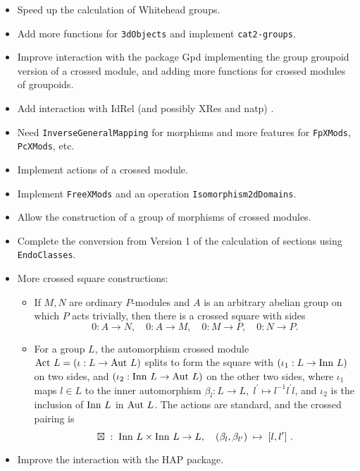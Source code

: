 \documentclass[a4paper,11pt]{report}
\begin{document}
{{\begin{itemize}
\item  Speed up the calculation of Whitehead groups. 
\item  Add more functions for \texttt{3dObjects} and implement \texttt{cat2-groups}. 
\item  Improve interaction with the package \textsf{Gpd} implementing the group groupoid version of a crossed module, and adding more
functions for crossed modules of groupoids. 
\item  Add interaction with \textsf{IdRel} (and possibly \textsf{XRes} and \textsf{natp}) . 
\item  Need \texttt{InverseGeneralMapping} for morphisms and more features for \texttt{FpXMods}, \texttt{PcXMods}, etc. 
\item  Implement actions of a crossed module. 
\item  Implement \texttt{FreeXMods} and an operation \texttt{Isomorphism2dDomains}. 
\item  Allow the construction of a group of morphisms of crossed modules. 
\item  Complete the conversion from Version 1 of the calculation of sections using \texttt{EndoClasses}. 
\item  More crossed square constructions: 
\begin{itemize}
\item  If $M, N$ are ordinary $P$-modules and $A$ is an arbitrary abelian group on which $P$ acts trivially, then there is a crossed square with sides 
\[ 0 : A \to N,\quad 0 : A \to M,\quad 0 : M \to P,\quad 0 : N \to P. \]
 
\item  For a group $L$, the automorphism crossed module ${\rm Act}\ L = (\iota : L \to {\rm Aut}\ L)$ splits to form the square with $(\iota_1 : L \to {\rm Inn}\ L)$ on two sides, and $(\iota_2 : {\rm Inn}\ L \to {\rm Aut}\ L)$ on the other two sides, where $\iota_1$ maps $l \in L$ to the inner automorphism $\beta_l : L \to L,\; l^{\prime} \mapsto l^{-1}l^{\prime}l$, and $\iota_2$ is the inclusion of ${\rm Inn}\ L$ in ${\rm Aut}\ L$. The actions are standard, and the crossed pairing is 
\[ \boxtimes \;:\; {\rm Inn}\ L \times {\rm Inn}\ L \to L, \quad (\beta_l,
\beta_{l^{\prime}}) \;\mapsto\; [l, l^{\prime}]~. \]
 
\end{itemize}
 
\item  Improve the interaction with the \textsf{HAP} package. 
\end{itemize}
 }

 }
\end{document}
